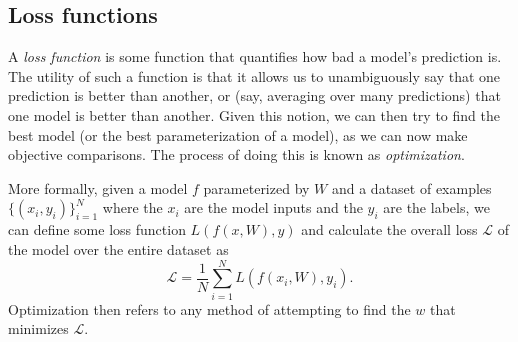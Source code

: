 \subsection{Loss functions}
A \emph{loss function} is some function that quantifies how bad a model's prediction is. The utility of such a function is that it allows us to unambiguously say that one prediction is better than another, or (say, averaging over many predictions) that one model is better than another. Given this notion, we can then try to find the best model (or the best parameterization of a model), as we can now make objective comparisons. The process of doing this is known as \emph{optimization}.

More formally, given a model $f$ parameterized by $W$ and a dataset of examples $\{(x_i, y_i)\}_{i=1}^N$ where the $x_i$ are the model inputs and the $y_i$ are the labels, we can define some loss function $L(f(x, W), y)$ and calculate the overall loss $\mathcal{L}$ of the model over the entire dataset as
$$\mathcal{L} = \frac{1}{N}\sum_{i=1}^N L\left(f\left(x_i, W\right), y_i\right).$$
Optimization then refers to any method of attempting to find the $w$ that minimizes $\mathcal{L}$.

